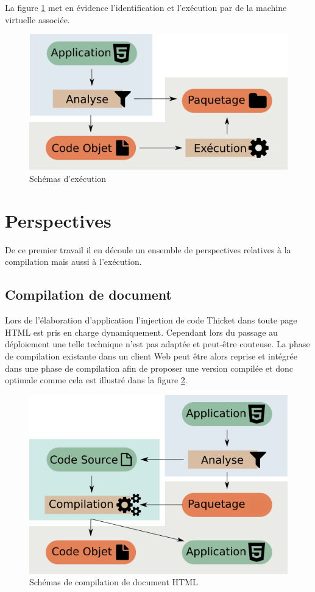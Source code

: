\documentclass[twoside,a4paper]{article}
\begin{document}
La   figure  \ref{execute}   met  en   évidence  l'identification   et
l'exécution par de la machine virtuelle associée.

\begin{figure}[h]
\centering
\includegraphics[scale=0.45]{execute} 
\caption{Schémas d'exécution}
\label{execute}
\end{figure}

\section{Perspectives}

De  ce premier  travail  il  en découle  un  ensemble de  perspectives
relatives à la compilation mais aussi à l'exécution.

\subsection{Compilation de document} 

Lors de  l'élaboration d'application l'injection de  code Thicket dans
toute page  HTML est pris  en charge dynamiquement. Cependant  lors du
passage  au  déploiement une  telle  technique  n'est pas  adaptée  et
peut-être couteuse. La  phase de compilation existante  dans un client
Web peut être alors reprise et  intégrée dans une phase de compilation
afin de proposer une version compilée  et donc optimale comme cela est
illustré dans la figure \ref{precompile}.

\begin{figure}[h]
\centering
\includegraphics[scale=0.45]{precompile} 
\caption{Schémas de compilation de document HTML}
\label{precompile}
\end{figure}
\end{document}
